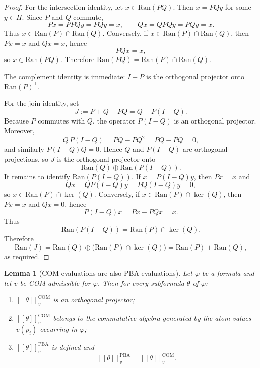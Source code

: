 \documentclass[11pt]{article}
\theoremstyle{plain}
\newtheorem{lemma}[theorem]{Lemma}
\theoremstyle{definition}
\newcommand{\COM}{\mathrm{COM}}
\newcommand{\PBA}{\mathrm{PBA}}
\newcommand{\Ran}{\mathrm{Ran}}
\newcommand{\sem}[1]{\left[\!\left[#1\right]\!\right]}
\begin{document}
\begin{proof}
For the intersection identity, let $x\in\Ran(PQ)$.
Then $x=PQy$ for some $y\in H$.
Since $P$ and $Q$ commute,
\[
Px=PPQy=PQy=x,
\qquad
Qx=QPQy=PQy=x.
\]
Thus $x\in\Ran(P)\cap\Ran(Q)$.
Conversely, if $x\in\Ran(P)\cap\Ran(Q)$, then $Px=x$ and $Qx=x$, hence
\[
PQx=x,
\]
so $x\in\Ran(PQ)$.
Therefore $\Ran(PQ)=\Ran(P)\cap\Ran(Q)$.

The complement identity is immediate: $I-P$ is the orthogonal projector onto $\Ran(P)^{\perp}$.

For the join identity, set
\[
J:=P+Q-PQ = Q + P(I-Q).
\]
Because $P$ commutes with $Q$, the operator $P(I-Q)$ is an orthogonal projector.
Moreover,
\[
Q\,P(I-Q)=PQ-PQ^2=PQ-PQ=0,
\]
and similarly $P(I-Q)Q=0$.
Hence $Q$ and $P(I-Q)$ are orthogonal projections, so $J$ is the orthogonal projector onto
\[
\Ran(Q)\oplus \Ran(P(I-Q)).
\]
It remains to identify $\Ran(P(I-Q))$.
If $x=P(I-Q)y$, then $Px=x$ and
\[
Qx=QP(I-Q)y=PQ(I-Q)y=0,
\]
so $x\in\Ran(P)\cap\ker(Q)$.
Conversely, if $x\in\Ran(P)\cap\ker(Q)$, then $Px=x$ and $Qx=0$, hence
\[
P(I-Q)x=Px-PQx=x.
\]
Thus
\[
\Ran(P(I-Q))=\Ran(P)\cap\ker(Q).
\]
Therefore
\[
\Ran(J)=\Ran(Q)\oplus\bigl(\Ran(P)\cap\ker(Q)\bigr)=\Ran(P)+\Ran(Q),
\]
as required.
\end{proof}

\begin{lemma}[COM evaluations are also PBA evaluations]\label{lem:com-to-pba-eval}
Let $\varphi$ be a formula and let $v$ be COM-admissible for $\varphi$.
Then for every subformula $\theta$ of $\varphi$:
\begin{enumerate}[label=(\roman*),leftmargin=2em]
  \item $\sem{\theta}^{\COM}_v$ is an orthogonal projector;
  \item $\sem{\theta}^{\COM}_v$ belongs to the commutative algebra generated by the atom values $v(p_i)$ occurring in $\varphi$;
  \item $\sem{\theta}^{\PBA}_v$ is defined and
  \[
  \sem{\theta}^{\PBA}_v = \sem{\theta}^{\COM}_v.
  \]
\end{enumerate}
\end{lemma}
\end{document}
